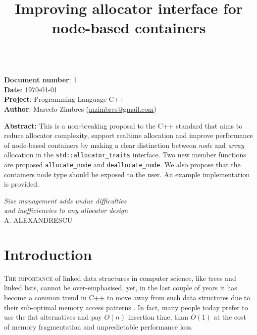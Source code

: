 \documentclass[11pt]{article}
\begin{document}
\date{}
\title{\vspace{-2cm} \bf Improving allocator interface for node-based containers}
\maketitle
\noindent
\vspace{-1cm} \\
{\bf Document number}:  1 \\
{\bf Date}:  \today \\
{\bf Project}: Programming Language C++ \\
{\bf Author}: Marcelo Zimbres (\href{mailto:mzimbres@gmail.com}{mzimbres@gmail.com}) 

\vspace{1cm}

\noindent
{\bf Abstract: }This is a non-breaking proposal to the C++ standard that aims
to reduce allocator complexity, support realtime allocation and improve
performance of node-based containers by making a clear distinction between {\it node}
and {\it array} allocation in the \texttt{std::allocator\_traits} interface.
Two new member functions are proposed \texttt{allocate\_node} and
\texttt{deallocate\_node}. We also propose that the containers node type should
be exposed to the user. An example implementation is provided.

\tableofcontents

\vfill
\begin{flushright}
\noindent
{\it Size management adds undue difficulties \\
     and inefficiencies to any allocator design} \\
A. ALEXANDRESCU \\
\medskip
{\it }
\end{flushright}
\medskip

\section{Introduction}
\textsc{The importance} of linked data structures in computer science, like
trees and linked lists, cannot be over-emphasised, yet, in the last couple of
years it has become a common trend in C++ to move away from such data
structures due to their sub-optimal memory access patterns \cite{middleditch,
chandler, meyers}.  In fact, many people today prefer to use the flat
alternatives and pay $O(n)$ insertion time, than $O(1)$ at the cost of memory
fragmentation and unpredictable performance loss.  
\end{document}
